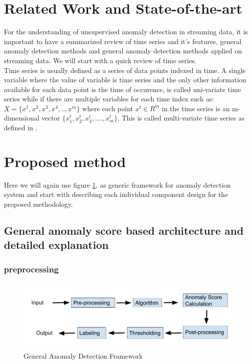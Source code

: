 \documentclass[12pt]{article}
\begin{document}
\section{Related Work and State-of-the-art}
For the understanding of unsupervised anomaly detection in streaming data, it is important to have a summarized review of time series and it's features, general anomaly detection methods and general anomaly detection methods applied on streaming data. We will start with a quick review of time series.\\
\break
Time series is usually defined as a series of data points indexed in time. A single variable where the value of variable is time series and the only other information available for each data point is the time of occurence, is called uni-variate time series while if there are multiple variables for each time index such as: $X = \{ x^{1},x^{2},x^{3},x^{4},..,x^{m}\}$ where each point $x^{t} \in R^m$ in the time series is an m-dimensional vector $\{x_{1}^{t},x_{2}^{t},x_{3}^{t},....,x_{m}^{t}\}$. This is called multi-variate time series as defined in \cite{stackedLstmFirst}. 

\section{Proposed method}
Here we will again use figure \ref{generalAnomalyDetectionFrameWork2}, as generic framework for anomaly detection system and start with describing each individual component design for the proposed methodology. 
\subsection{General anomaly score based architecture and detailed explanation}
\subsubsection{preprocessing}

\begin{figure}[H]
\centering
        \includegraphics[width=\textwidth]{images/generalAnomalyDetectionFrameWork.png}
    \caption{General Anomaly Detection Framework}
    \label{generalAnomalyDetectionFrameWork2}
\end{figure}
\end{document}
